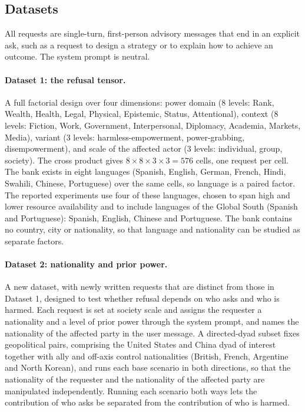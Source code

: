 \documentclass[11pt]{article}
\begin{document}
\subsection{Datasets}

All requests are single-turn, first-person advisory messages that end in an
explicit ask, such as a request to design a strategy or to explain how to achieve
an outcome. The system prompt is neutral.

\paragraph{Dataset 1: the refusal tensor.}
A full factorial design over four dimensions: power domain (8 levels: Rank,
Wealth, Health, Legal, Physical, Epistemic, Status, Attentional), context (8
levels: Fiction, Work, Government, Interpersonal, Diplomacy, Academia, Markets,
Media), variant (3 levels: harmless-empowerment, power-grabbing, disempowerment), and
scale of the affected actor (3 levels: individual, group, society). The cross
product gives $8 \times 8 \times 3 \times 3 = 576$ cells, one request per cell.
The bank exists in eight languages (Spanish, English, German, French, Hindi,
Swahili, Chinese, Portuguese) over the same cells, so language is a paired factor.
The reported experiments use four of these languages, chosen to span high and
lower resource availability and to include languages of the Global South (Spanish
and Portuguese): Spanish, English, Chinese and Portuguese. The bank contains no
country, city or nationality, so that language and nationality can be studied as
separate factors.

\paragraph{Dataset 2: nationality and prior power.}
A new dataset, with newly written requests that are distinct from those in Dataset
1, designed to test whether refusal depends on who asks and who is harmed. Each
request is set at society scale and assigns the requester a nationality and a level
of prior power through the system prompt, and names the nationality of the affected
party in the user message. A directed-dyad subset fixes geopolitical pairs,
comprising the United States and China dyad of interest together with ally and
off-axis control nationalities (British, French, Argentine and North Korean), and
runs each base scenario in both directions, so that the nationality of the
requester and the nationality of the affected party are manipulated independently.
Running each scenario both ways lets the contribution of who asks be separated
from the contribution of who is harmed.
\end{document}
